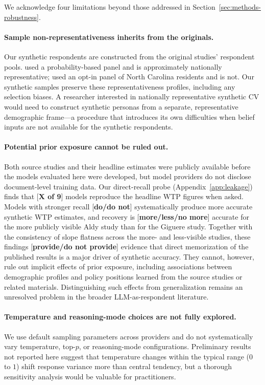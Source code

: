 \documentclass[12pt]{article}
\begin{document}
We acknowledge four limitations beyond those addressed in
Section~\ref{sec:methods-robustness}.

\paragraph{Sample non-representativeness inherits from the originals.}
Our synthetic respondents are constructed from the original studies'
respondent pools. \textcite{Aldy2012} used a probability-based panel
and is approximately nationally representative; \textcite{Giguere2020}
used an opt-in panel of North Carolina residents and is not. Our
synthetic samples preserve these representativeness profiles, including
any selection biases. A researcher interested in nationally
representative synthetic CV would need to construct synthetic personas
from a separate, representative demographic frame---a procedure that
introduces its own difficulties when belief inputs are not available
for the synthetic respondents.

\paragraph{Potential prior exposure cannot be ruled out.}
Both source studies and their headline estimates were publicly available
before the models evaluated here were developed, but model providers do
not disclose document-level training data. Our direct-recall probe
(Appendix~\ref{app:leakage}) finds that [\textbf{X of 9}] models
reproduce the headline WTP figures when asked. Models with stronger recall
[\textbf{do/do not}] systematically produce more accurate synthetic WTP
estimates, and recovery is [\textbf{more/less/no more}] accurate for the
more publicly visible Aldy study than for the Giguere study. Together with
the consistency of slope flatness across the more- and less-visible studies,
these findings [\textbf{provide/do not provide}] evidence that direct
memorization of the published results is a major driver of synthetic
accuracy. They cannot, however, rule out implicit effects of prior exposure,
including associations between demographic profiles and policy positions
learned from the source studies or related materials. Distinguishing such
effects from generalization remains an unresolved problem in the broader
LLM-as-respondent literature.

\paragraph{Temperature and reasoning-mode choices are not fully
explored.} We use default sampling parameters across providers and do
not systematically vary temperature, top-$p$, or reasoning-mode
configurations. Preliminary results not reported here suggest that
temperature changes within the typical range ($0$ to $1$) shift response
variance more than central tendency, but a thorough sensitivity analysis
would be valuable for practitioners.
\end{document}
